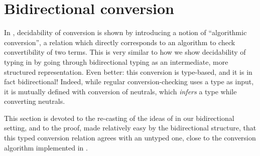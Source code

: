 \chapter{Bidirectional conversion}
\label{chap:bidir-conv}

In , decidability of conversion is shown by introducing a notion
of “algorithmic conversion”, a relation which directly corresponds to an algorithm to
check convertibility of two terms. This is very similar to how we show decidability of typing
in  by going through bidirectional typing as an intermediate, more structured
representation.
Even better: this conversion is type-based,%
and it is in fact bidirectional! Indeed, while regular conversion-checking uses a type as
input, it is mutually defined with conversion of neutrals, which \emph{infers} a type
while converting neutrals.

This section is devoted to the re-casting of the ideas of  in our
bidirectional setting, and to the proof, made relatively easy by the bidirectional structure,
that this typed conversion relation agrees with an untyped one, close to the conversion algorithm
implemented in .